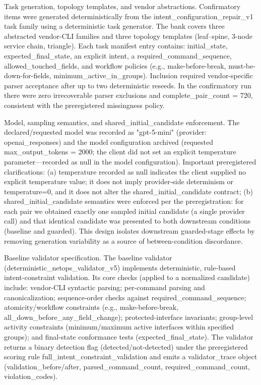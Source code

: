 \documentclass[conference]{IEEEtran}
\begin{document}
Task generation, topology templates, and vendor abstractions. Confirmatory items were generated deterministically from the intent\_configuration\_repair\_v1 task family using a deterministic task generator. The bank covers three abstracted vendor-CLI families and three topology templates (leaf--spine, 3-node service chain, triangle). Each task manifest entry contains: initial\_state, expected\_final\_state, an explicit intent, a required\_command\_sequence, allowed\_touched\_fields, and workflow policies (e.g., make-before-break, must-be-down-for-fields, minimum\_active\_in\_groups). Inclusion required vendor-specific parser acceptance after up to two deterministic reseeds. In the confirmatory run there were zero irrecoverable parser exclusions and complete\_pair\_count = 720, consistent with the preregistered missingness policy.

Model, sampling semantics, and shared\_initial\_candidate enforcement. The declared/requested model was recorded as "gpt-5-mini" (provider: openai\_responses) and the model configuration archived (requested max\_output\_tokens = 2000; the client did not set an explicit temperature parameter---recorded as null in the model configuration). Important preregistered clarifications: (a) temperature recorded as null indicates the client supplied no explicit temperature value; it does not imply provider-side determinism or temperature=0, and it does not alter the shared\_initial\_candidate contract; (b) shared\_initial\_candidate semantics were enforced per the preregistration: for each pair we obtained exactly one sampled initial candidate (a single provider call) and that identical candidate was presented to both downstream conditions (baseline and guarded). This design isolates downstream guarded-stage effects by removing generation variability as a source of between-condition discordance.

Baseline validator specification. The baseline validator (deterministic\_netops\_validator\_v5) implements deterministic, rule-based intent-constraint validation. Its core checks (applied to a normalized candidate) include: vendor-CLI syntactic parsing; per-command parsing and canonicalization; sequence-order checks against required\_command\_sequence; atomicity/workflow constraints (e.g., make-before-break, all\_down\_before\_any\_field\_change); protected-interface invariants; group-level activity constraints (minimum/maximum active interfaces within specified groups); and final-state conformance tests (expected\_final\_state). The validator returns a binary detection flag (detected/not-detected) under the preregistered scoring rule full\_intent\_constraint\_validation and emits a validator\_trace object (validation\_before/after, parsed\_command\_count, required\_command\_count, violation\_codes).
\end{document}
